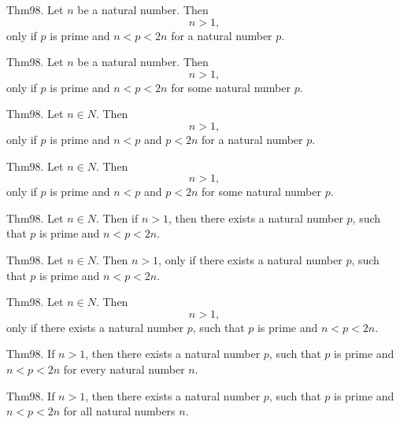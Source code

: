 \documentclass{article}
\begin{document}
Thm98. Let $n$ be a natural number. Then $$n > 1,$$ only if $p$ is prime and $n < p < 2 n$ for a natural number $p$.

Thm98. Let $n$ be a natural number. Then $$n > 1,$$ only if $p$ is prime and $n < p < 2 n$ for some natural number $p$.

Thm98. Let $n \in N$. Then $$n > 1,$$ only if $p$ is prime and $n < p$ and $p < 2 n$ for a natural number $p$.

Thm98. Let $n \in N$. Then $$n > 1,$$ only if $p$ is prime and $n < p$ and $p < 2 n$ for some natural number $p$.

Thm98. Let $n \in N$. Then if $n > 1$, then there exists a natural number $p$, such that $p$ is prime and $n < p < 2 n$.

Thm98. Let $n \in N$. Then $n > 1$, only if there exists a natural number $p$, such that $p$ is prime and $n < p < 2 n$.

Thm98. Let $n \in N$. Then $$n > 1,$$ only if there exists a natural number $p$, such that $p$ is prime and $n < p < 2 n$.

Thm98. If $n > 1$, then there exists a natural number $p$, such that $p$ is prime and $n < p < 2 n$ for every natural number $n$.

Thm98. If $n > 1$, then there exists a natural number $p$, such that $p$ is prime and $n < p < 2 n$ for all natural numbers $n$.
\end{document}
